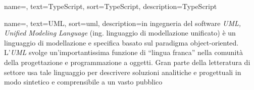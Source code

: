 {
    name=,
    text=TypeScript,
    sort=TypeScript,
    description={TypeScript}
}

{
    name=,
    text=UML,
    sort=uml,
    description={in ingegneria del software \emph{UML, Unified Modeling Language} (ing. linguaggio di modellazione unificato) è un linguaggio di modellazione e specifica basato sul paradigma object-oriented. L'\emph{UML} svolge un'importantissima funzione di ``lingua franca'' nella comunità della progettazione e programmazione a oggetti. Gran parte della letteratura di settore usa tale linguaggio per descrivere soluzioni analitiche e progettuali in modo sintetico e comprensibile a un vasto pubblico}
}
